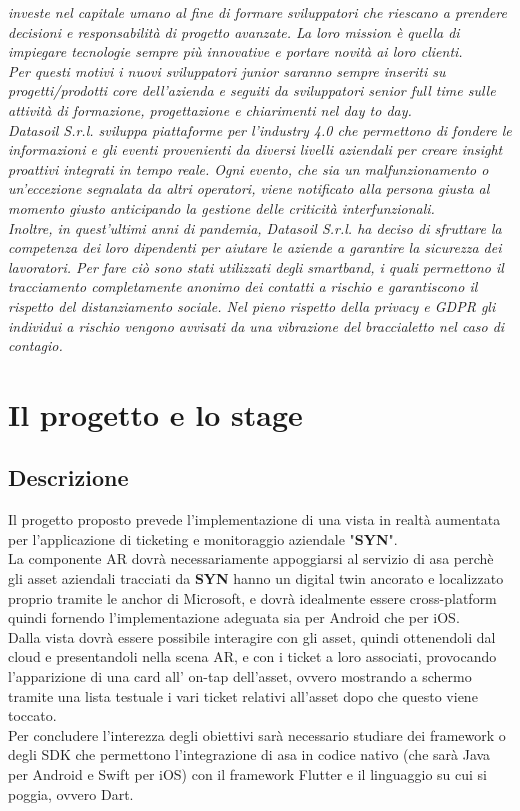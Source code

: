 \textit{\small{
investe nel capitale umano al fine di formare sviluppatori che riescano a prendere decisioni e responsabilità di progetto avanzate. La loro mission è quella di impiegare tecnologie sempre più innovative e portare novità ai loro clienti. \\Per questi motivi i nuovi sviluppatori junior saranno sempre inseriti su progetti/prodotti core dell’azienda e seguiti da sviluppatori senior full time sulle attività di formazione, progettazione e chiarimenti nel day to day.\\
Datasoil S.r.l. sviluppa piattaforme per l’industry 4.0 che permettono di fondere le informazioni e gli eventi provenienti da diversi livelli aziendali per creare insight proattivi integrati in tempo reale. Ogni evento, che sia un malfunzionamento o un'eccezione segnalata da altri operatori, viene notificato alla persona giusta al momento giusto anticipando la gestione delle criticità interfunzionali.\\
Inoltre, in quest'ultimi anni di pandemia, Datasoil S.r.l. ha deciso di sfruttare la competenza dei loro dipendenti per aiutare le aziende a garantire la sicurezza dei lavoratori. Per fare ciò sono stati utilizzati degli smartband, i quali permettono il tracciamento completamente anonimo dei contatti a rischio e garantiscono il rispetto del distanziamento sociale. Nel pieno rispetto della privacy e GDPR gli individui a rischio vengono avvisati da una vibrazione del braccialetto nel caso di contagio.
}}
\section{Il progetto e lo stage}

\subsection{Descrizione}
Il progetto proposto prevede l'implementazione di una vista in realtà aumentata per l'applicazione di ticketing e monitoraggio aziendale "\textbf{SYN}".\\
La componente AR dovrà necessariamente appoggiarsi al servizio di \gls{asa} perchè gli \gls{asset} aziendali tracciati da \textbf{SYN} hanno un \gls{digital twin} ancorato e localizzato proprio tramite le \gls{anchor} di Microsoft, e dovrà idealmente essere cross-platform quindi fornendo l'implementazione adeguata sia per Android che per iOS.\\
Dalla vista dovrà essere possibile interagire con gli \gls{asset}, quindi ottenendoli dal cloud e presentandoli nella scena AR, e con i ticket a loro associati, provocando l'apparizione di una card all' on-tap dell'\gls{asset}, ovvero mostrando a schermo tramite una lista testuale i vari ticket relativi all'\gls{asset} dopo che questo viene toccato.\\
Per concludere l'interezza degli obiettivi sarà necessario studiare dei \gls{framework} o degli \gls{SDK} che permettono l'integrazione di \gls{asa} in codice nativo (che sarà Java per Android e Swift per iOS) con il \gls{framework} Flutter e il linguaggio su cui si poggia, ovvero Dart.


